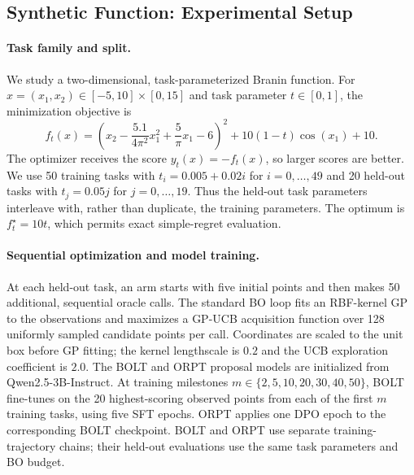 \subsection{Synthetic Function: Experimental Setup}
\label{sec:synthetic-setup}

\paragraph{Task family and split.}
We study a two-dimensional, task-parameterized Branin function.  For
$x=(x_1,x_2)\in[-5,10]\times[0,15]$ and task parameter $t\in[0,1]$, the
minimization objective is
\begin{equation}
 f_t(x)=\left(x_2-\frac{5.1}{4\pi^2}x_1^2+\frac{5}{\pi}x_1-6\right)^2
       +10(1-t)\cos(x_1)+10.
\end{equation}
The optimizer receives the score $y_t(x)=-f_t(x)$, so larger scores are
better.  We use 50 training tasks with
$t_i=0.005+0.02i$ for $i=0,\ldots,49$ and 20 held-out tasks with
$t_j=0.05j$ for $j=0,\ldots,19$.  Thus the held-out task parameters
interleave with, rather than duplicate, the training parameters.  The
optimum is $f_t^\star=10t$, which permits exact simple-regret evaluation.

\paragraph{Sequential optimization and model training.}
At each held-out task, an arm starts with five initial points and then
makes 50 additional, sequential oracle calls.  The standard BO loop fits
an RBF-kernel GP to the observations and maximizes a GP-UCB acquisition
function over 128 uniformly sampled candidate points per call.  Coordinates
are scaled to the unit box before GP fitting; the kernel lengthscale is
$0.2$ and the UCB exploration coefficient is $2.0$.  The BOLT and ORPT
proposal models are initialized from Qwen2.5-3B-Instruct.  At training
milestones $m\in\{2,5,10,20,30,40,50\}$, BOLT fine-tunes on the 20
highest-scoring observed points from each of the first $m$ training tasks,
using five SFT epochs.  ORPT applies one DPO epoch to the corresponding
BOLT checkpoint.  BOLT and ORPT use separate training-trajectory chains;
their held-out evaluations use the same task parameters and BO budget.

